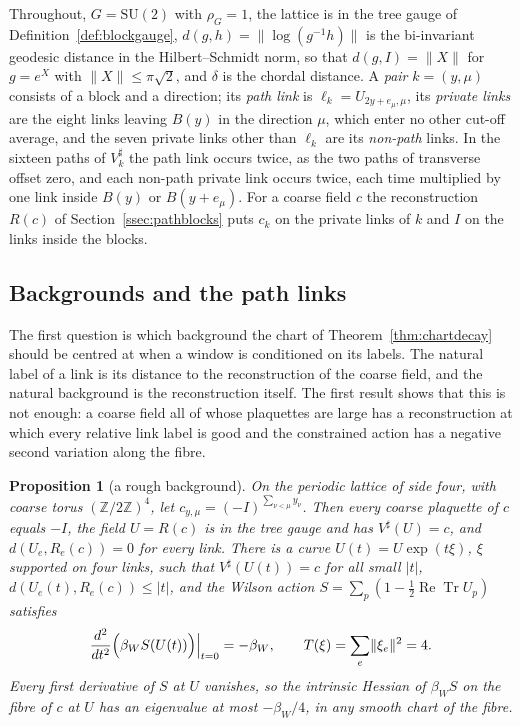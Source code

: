 \documentclass[11pt]{amsart}
\newtheorem{proposition}[theorem]{Proposition}
\theoremstyle{definition}
\theoremstyle{remark}
\numberwithin{equation}{section}
\newcommand{\Z}{\mathbb{Z}}
\newcommand{\SU}{\mathrm{SU}}
\newcommand{\ReTr}{\operatorname{Re}\operatorname{Tr}}
\begin{document}
Throughout, $G=\SU(2)$ with $\rho_G=1$, the lattice is in the tree gauge of
Definition~\ref{def:blockgauge}, $d(g,h)=\lVert\log(g^{-1}h)\rVert$ is the
bi-invariant geodesic distance in the Hilbert--Schmidt norm, so that
$d(g,I)=\lVert X\rVert$ for $g=e^X$ with $\lVert X\rVert\le\pi\sqrt2$,
and $\delta$ is the chordal distance. A \emph{pair} $k=(y,\mu)$ consists of
a block and a direction; its \emph{path link} is $\ell_k=U_{2y+e_\mu,\mu}$,
its \emph{private links} are the eight links leaving $B(y)$ in the direction
$\mu$, which enter no other cut-off average, and the seven private links
other than $\ell_k$ are its \emph{non-path} links. In the sixteen paths of
$V^\sharp_k$ the path link occurs twice, as the two paths of transverse
offset zero, and each non-path private link occurs twice, each time
multiplied by one link inside $B(y)$ or $B(y+e_\mu)$. For a coarse field
$c$ the reconstruction $R(c)$ of Section~\ref{ssec:pathblocks} puts $c_k$ on
the private links of $k$ and $I$ on the links inside the blocks.

\subsection{Backgrounds and the path links}\label{ssec:branches}

The first question is which background the chart of
Theorem~\ref{thm:chartdecay} should be centred at when a window is
conditioned on its labels. The natural label of a link is its distance to
the reconstruction of the coarse field, and the natural background is the
reconstruction itself. The first result shows that this is not enough: a
coarse field all of whose plaquettes are large has a reconstruction at
which every relative link label is good and the constrained action has a
negative second variation along the fibre.

\begin{proposition}[a rough background]\label{prop:roughbackground}
On the periodic lattice of side four, with coarse torus $(\Z/2\Z)^4$, let
$c_{y,\mu}=(-I)^{\sum_{\nu<\mu}y_\nu}$. Then every coarse plaquette of $c$
equals $-I$, the field $U=R(c)$ is in the tree gauge and has
$V^\sharp(U)=c$, and $d(U_e,R_e(c))=0$ for every link. There is a curve
$U(t)=U\exp(t\xi)$, $\xi$ supported on four links, such that
$V^\sharp(U(t))=c$ for all small $|t|$, $d(U_e(t),R_e(c))\le|t|$, and the
Wilson action $S=\sum_p(1-\frac12\ReTr U_p)$ satisfies
\[
\frac{d^2}{dt^2}\Bigl(\beta_WS(U(t))\Bigr)\Big|_{t=0}=-\beta_W,\qquad
T(\xi)=\sum_e\lVert\xi_e\rVert^2=4 .
\]
Every first derivative of $S$ at $U$ vanishes, so the intrinsic Hessian
of $\beta_WS$ on the fibre of $c$ at $U$ has an eigenvalue at most
$-\beta_W/4$, in any smooth chart of the fibre.
\end{proposition}
\end{document}
